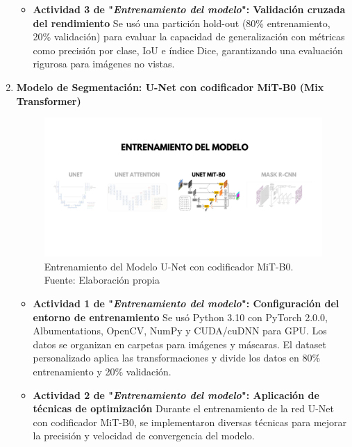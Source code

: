 \begin{enumerate}
\begin{itemize}
  \item\textbf{Actividad 3 de "\textit{Entrenamiento del modelo}": Validación cruzada del rendimiento}
  Se usó una partición hold-out (80\% entrenamiento, 20\% validación) para evaluar la capacidad de generalización con métricas como precisión por clase, IoU e índice Dice, garantizando una evaluación rigurosa para imágenes no vistas.

  \end{itemize}
\newpage
  \item \textbf{Modelo de Segmentación: U-Net con codificador MiT-B0 (Mix Transformer)}
  \begin{figure}[H]
	\begin{center}
		\includegraphics[width=1\textwidth]{4/figures/entrunetmit.png}
		\caption[Entrenamiento del Modelo U-Net con codificador MiT-B0]{Entrenamiento del Modelo U-Net con codificador MiT-B0.\\
		Fuente: Elaboración propia}
		\label{4:figentunetmit}
	\end{center}
\end{figure}
  \begin{itemize}
  \item\textbf{Actividad 1 de "\textit{Entrenamiento del modelo}": Configuración del entorno de entrenamiento}
  Se usó Python 3.10 con PyTorch 2.0.0, Albumentations, OpenCV, NumPy y CUDA/cuDNN para GPU. Los datos se organizan en carpetas para imágenes y máscaras. El dataset personalizado aplica las transformaciones y divide los datos en 80\% entrenamiento y 20\% validación.


  \item\textbf{Actividad 2 de "\textit{Entrenamiento del modelo}": Aplicación de técnicas de optimización}
   Durante el entrenamiento de la red U-Net con codificador MiT-B0, se implementaron diversas técnicas para mejorar la precisión y velocidad de convergencia del modelo.


\end{itemize}
\end{enumerate}
